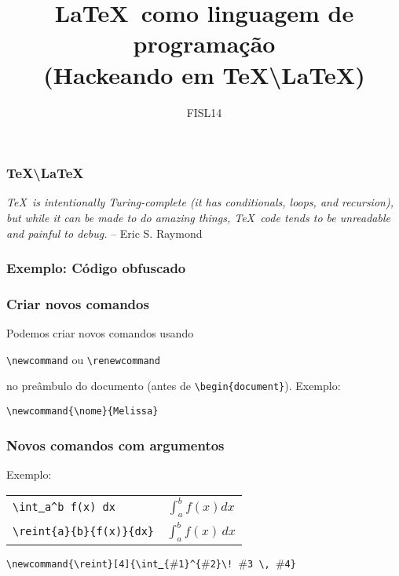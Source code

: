 \documentclass{beamer}
\title[\LaTeX\ como linguagem de programação]{\LaTeX\ como linguagem de programação\\(Hackeando em \TeX\textbackslash\LaTeX)} \author[M. Weber Mendonça]
\institute[UFSC]{\inst{1} Universidade Federal de Santa Catarina}
\date{FISL14}
\newcommand{\code}[1]{\texttt{#1}}
\newcommand{\reint}[4]{\int_#1^#2 \! #3 \, #4}
\begin{document}
\begin{frame}
   \titlepage
\end{frame}
\begin{frame}
   \frametitle{\TeX\textbackslash\LaTeX}
   \begin{block}{}
      \emph{\TeX\ is intentionally Turing-complete (it has conditionals, loops, and recursion), but while it can be made to do amazing things, \TeX\ code tends to be unreadable and painful to debug.} -- Eric S. Raymond
   \end{block}
\end{frame}
\begin{frame}
   \frametitle{Exemplo: Código obfuscado}
   \begin{block}{}
      \centering{\raisebox{0pt}[10pt][5pt]{\code{xii.tex}}}
   \end{block}
\end{frame}
\begin{frame}
   \frametitle{Criar novos comandos}
   Podemos criar novos comandos usando 
   \begin{center}
      \begin{block}{}
         \begin{center}
            \code{\textbackslash newcommand} ou \code{\textbackslash renewcommand}
         \end{center}
      \end{block}
   \end{center}
   no preâmbulo do documento (antes de \code{\textbackslash begin\{document\}}).
   Exemplo:

   \begin{center}
      \code{\textbackslash newcommand\{\textbackslash nome\}\{Melissa\}}
   \end{center}
\end{frame}
\begin{frame}
   \frametitle{Novos comandos com argumentos}
   Exemplo: 
   \begin{center}
      \begin{tabular}{l c}
         \code{\textbackslash int\underline{ }a\^{}b f(x) dx} & $\displaystyle \int_a^b f(x) dx$\\
         \code{\textbackslash reint\{a\}\{b\}\{f(x)\}\{dx\}} & $\displaystyle \reint{a}{b}{f(x)}{dx}$
      \end{tabular}
   \end{center}
   \vspace{.5cm}
   \begin{center}
      \code{\textbackslash newcommand\{\textbackslash reint\}[4]\{\textbackslash int\underline{ }\{$\#$1\}\^{}\{$\#$2\}\textbackslash ! \!\!$\#$3 \textbackslash , $\#$4\}}
   \end{center}
\end{frame}
\end{document}
